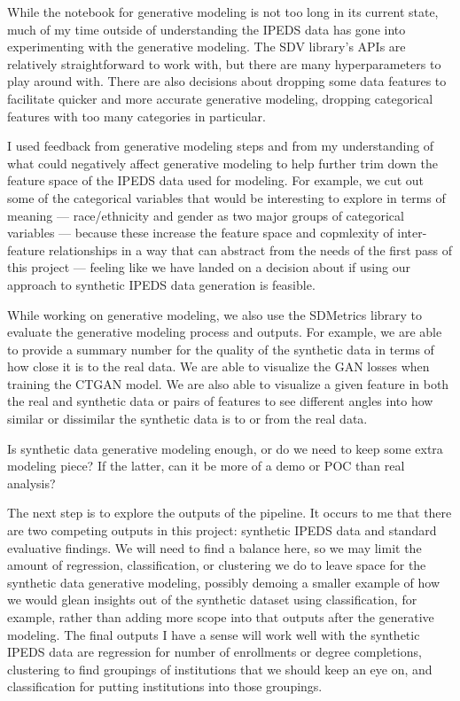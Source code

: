 \documentclass[sigconf, authorversion, nonacm]{acmart}
\begin{document}
    While the notebook for generative modeling is not too long in its current state, much of my time outside of understanding the IPEDS data has gone into experimenting with the generative modeling. The SDV library's APIs are relatively straightforward to work with, but there are many hyperparameters to play around with. There are also decisions about dropping some data features to facilitate quicker and more accurate generative modeling, dropping categorical features with too many categories in particular.

    I used feedback from generative modeling steps and from my understanding of what could negatively affect generative modeling to help further trim down the feature space of the IPEDS data used for modeling. For example, we cut out some of the categorical variables that would be interesting to explore in terms of meaning --- race/ethnicity and gender as two major groups of categorical variables --- because these increase the feature space and copmlexity of inter-feature relationships in a way that can abstract from the needs of the first pass of this project --- feeling like we have landed on a decision about if using our approach to synthetic IPEDS data generation is feasible.

    While working on generative modeling, we also use the SDMetrics library to evaluate the generative modeling process and outputs. For example, we are able to provide a summary number for the quality of the synthetic data in terms of how close it is to the real data. We are able to visualize the GAN losses when training the CTGAN model. We are also able to visualize a given feature in both the real and synthetic data or pairs of features to see different angles into how similar or dissimilar the synthetic data is to or from the real data.








    Is synthetic data generative modeling enough, or do we need to keep some extra modeling piece? If the latter, can it be more of a demo or POC than real analysis?







    The next step is to explore the outputs of the pipeline. It occurs to me that there are two competing outputs in this project: synthetic IPEDS data and standard evaluative findings. We will need to find a balance here, so we may limit the amount of regression, classification, or clustering we do to leave space for the synthetic data generative modeling, possibly demoing a smaller example of how we would glean insights out of the synthetic dataset using classification, for example, rather than adding more scope into that outputs after the generative modeling. The final outputs I have a sense will work well with the synthetic IPEDS data are regression for number of enrollments or degree completions, clustering to find groupings of institutions that we should keep an eye on, and classification for putting institutions into those groupings.
\end{document}
